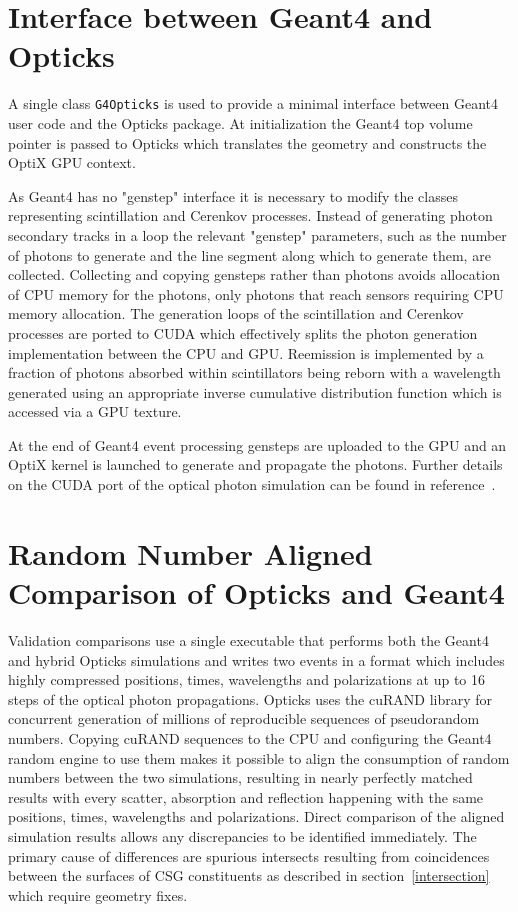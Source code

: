 \documentclass{webofc}
\begin{document}
\section{Interface between Geant4 and Opticks}
\label{simulation}
%
A single class {\tt G4Opticks} is used to provide a 
minimal interface between Geant4 user code and 
the Opticks package. 
At initialization the Geant4 top volume pointer is
passed to Opticks which translates the geometry and constructs 
the OptiX GPU context.

As Geant4 has no "genstep" interface it is necessary to modify the 
classes representing scintillation and Cerenkov processes.
Instead of generating photon secondary tracks in a loop the relevant "genstep" parameters, 
such as the number of photons to generate and the line segment along which to generate them, 
are collected. Collecting and copying gensteps rather than photons avoids allocation of CPU memory
for the photons, only photons that reach sensors requiring CPU memory allocation.
The generation loops of the scintillation and Cerenkov processes are ported to CUDA 
which effectively splits the photon generation implementation between the CPU and GPU.
Reemission is implemented by a fraction of photons absorbed within scintillators being 
reborn with a wavelength generated using an appropriate inverse cumulative distribution function
which is accessed via a GPU texture.

At the end of Geant4 event processing gensteps are uploaded to the GPU and an OptiX 
kernel is launched to generate and propagate the photons.
Further details on the CUDA port of the optical photon simulation can be found in reference~\cite{chep2016}.

%
\section{Random Number Aligned Comparison of Opticks and Geant4}
\label{validation}
%
Validation comparisons use a single executable that performs both
the Geant4 and hybrid Opticks simulations and writes two events in a format
which includes highly compressed positions, times, wavelengths and polarizations at up to 16 steps of the optical photon propagations.
Opticks uses the cuRAND\cite{curandURL} library for concurrent generation of millions of reproducible sequences of pseudorandom numbers.  
Copying cuRAND sequences to the CPU and configuring the Geant4 random engine to use them makes it possible to align the 
consumption of random numbers between the two simulations, resulting in nearly perfectly matched results with every scatter, 
absorption and reflection happening with the same positions, times, wavelengths and polarizations.
Direct comparison of the aligned simulation results allows any discrepancies to be identified immediately.
The primary cause of differences are spurious intersects resulting from coincidences between the surfaces
of CSG constituents as described in section~\ref{intersection} which require geometry fixes.
%
\end{document}
